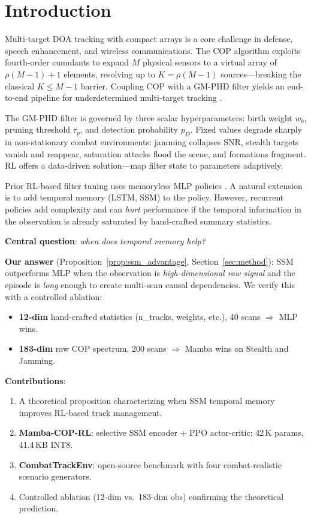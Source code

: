 \documentclass[conference]{IEEEtran}
\begin{document}
\section{Introduction}
\label{sec:intro}

Multi-target DOA tracking with compact arrays is a core challenge
in defense, speech enhancement, and wireless communications.
The COP algorithm \cite{choi2015underdetermined} exploits
fourth-order cumulants to expand $M$ physical sensors to a virtual
array of $\rho(M{-}1){+}1$ elements, resolving up to $K{=}\rho(M{-}1)$
sources---breaking the classical $K \leq M{-}1$ barrier.
Coupling COP with a GM-PHD filter \cite{vo2006gaussian} yields an
end-to-end pipeline for underdetermined multi-target
tracking \cite{choi2026irondome}.

The GM-PHD filter is governed by three scalar hyperparameters:
birth weight $w_b$, pruning threshold $\tau_p$, and detection
probability $p_D$.
Fixed values degrade sharply in non-stationary combat environments:
jamming collapses SNR, stealth targets vanish and reappear, saturation
attacks flood the scene, and formations fragment.
RL offers a data-driven solution---map filter state to parameters
adaptively.

Prior RL-based filter tuning uses memoryless MLP policies
\cite{rosello2018marlmot,stephan2022scene}.
A natural extension is to add temporal memory (LSTM, SSM) to the
policy. However, recurrent policies add complexity and can \emph{hurt}
performance if the temporal information in the observation is already
saturated by hand-crafted summary statistics.

\textbf{Central question}: \emph{when does temporal memory help?}

\textbf{Our answer} (Proposition~\ref{prop:ssm_advantage},
Section~\ref{sec:method}): SSM outperforms MLP when the observation
is \emph{high-dimensional raw signal} and the episode is \emph{long}
enough to create multi-scan causal dependencies.
We verify this with a controlled ablation:
\begin{itemize}
  \item \textbf{12-dim} hand-crafted statistics (n\_tracks, weights,
    etc.), 40 scans $\Rightarrow$ MLP wins.
  \item \textbf{183-dim} raw COP spectrum, 200 scans
    $\Rightarrow$ Mamba wins on Stealth and Jamming.
\end{itemize}

\textbf{Contributions}:
\begin{enumerate}
  \item A theoretical proposition characterizing when SSM temporal
    memory improves RL-based track management.
  \item \textbf{Mamba-COP-RL}: selective SSM encoder + PPO
    actor-critic; 42\,K params, 41.4\,KB INT8.
  \item \textbf{CombatTrackEnv}: open-source benchmark with four
    combat-realistic scenario generators.
  \item Controlled ablation (12-dim vs.\ 183-dim obs) confirming the
    theoretical prediction.
\end{enumerate}
\end{document}

